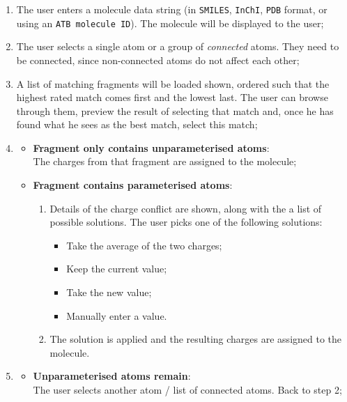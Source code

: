 \begin{enumerate}[itemsep=.1em, parsep=.2em, topsep=0em]
\item The user enters a molecule data string (in \verb|SMILES|, \verb|InChI|, \verb|PDB| format, or using an \verb|ATB molecule ID|). The molecule will be displayed to the user;
\item The user selects a single atom or a group of \emph{connected} atoms. They need to be connected, since non-connected atoms do not affect each other;
\item A list of matching fragments will be loaded shown, ordered such that the highest rated match comes first and the lowest last. The user can browse through them, preview the result of selecting that match and, once he has found what he sees as the best match, select this match;
\item
  \begin{itemize}[leftmargin=0cm, itemsep=.1em, parsep=.1em]
  \item[] {\bf Fragment only contains unparameterised atoms}:\\
    The charges from that fragment are assigned to the molecule;
  \item[]{\bf Fragment contains parameterised atoms}:
    \begin{enumerate}
    \item
      Details of the charge conflict are shown, along with the a list of possible solutions. The user picks one of the following solutions:
      \begin{itemize}[itemsep=.1em, parsep=.2em, topsep=0em]
      \item Take the average of the two charges;
      \item Keep the current value;
      \item Take the new value;
      \item Manually enter a value.
      \end{itemize}
    \item The solution is applied and the resulting charges are assigned to the molecule.
    \end{enumerate}
  \end{itemize}
\item
  \begin{itemize}[leftmargin=0cm, itemsep=.1em, parsep=.1em]
  \item[]{\bf Unparameterised atoms remain}:\\The user selects another atom / list of connected atoms. Back to step 2;

\end{itemize}
\end{enumerate}
